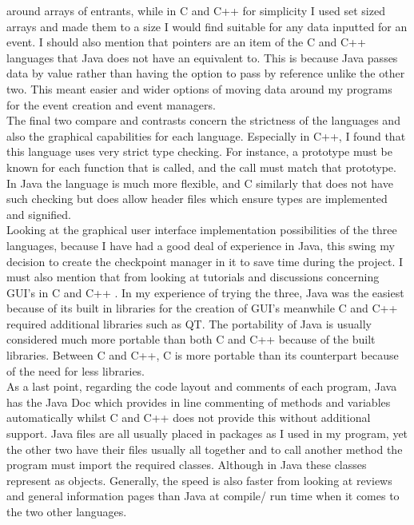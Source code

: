 \documentclass[a4paper]{article}
\begin{document}
around arrays of entrants, while in C and C++ for simplicity I used set sized 
arrays and made them to a size I would find suitable for any data inputted for an
event. I should also mention that pointers are an item of the C and C++
languages 
that Java does not have an equivalent to. This is because Java passes data by
value rather than having the option to pass  by reference unlike the other two.
This meant easier and wider options of moving data around my programs for the
event creation and event managers.
 \\[4mm]
The final two compare and contrasts concern the strictness of the languages and
also the graphical capabilities for each language. Especially in C++, I found
that this language uses very strict type checking. For instance, a prototype
must be known for each function that is called, and the call must match that
prototype. In Java the language is much more flexible, and C similarly that does
not have such checking but does allow header files which ensure types are
implemented and signified.
 \\[4mm]
 Looking at the graphical user interface implementation possibilities of the
three languages, because I have had a good deal of experience in Java, this
swing my decision to create the checkpoint manager in it to save time during the
project. I must also mention that from looking at tutorials and discussions
concerning GUI's in C and C++ \cite{gui}. In my experience of trying the three,
Java was the easiest because of its built in libraries for the creation of GUI's
meanwhile C and C++ required additional libraries such as QT. The portability of 
Java is usually considered much more portable than both C and C++ because of the 
built libraries. Between C and C++, C is more portable than its counterpart because 
of the need for less libraries. \cite{portable}
 \\[4mm]
As a last point, regarding the code layout and comments of each program, Java
has the Java Doc which provides in line commenting of methods and variables
automatically whilst C and C++ does not provide this without additional support.
Java files are all usually placed in packages as I used in my program, yet the
other two have their files usually all together and to call another method the
program must import the required classes. Although in Java these classes
represent as objects. Generally, the speed is also faster from looking at reviews 
and general information pages \cite{speed} than Java at compile/ run time when it 
comes to the two other languages. 
\end{document}
